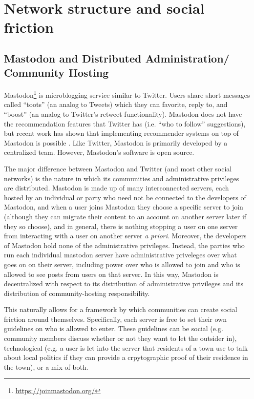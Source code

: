 \documentclass[sigconf,authordraft]{acmart}
\begin{document}
\section{Network structure and social friction}

\subsection{Mastodon and Distributed Administration/ Community Hosting}

Mastodon\footnote{\url{https://joinmastodon.org/}} is microblogging service similar to Twitter. Users share short messages called ``toots'' (an analog to Tweets) which they can favorite, reply to, and ``boost'' (an analog to Twitter's retweet functionality). Mastodon does not have the recommendation features that Twitter has (i.e. ``who to follow'' suggestions), but recent work has shown that implementing recommender systems on top of Mastodon is possible \cite{trienes2018recommending}. Like Twitter, Mastodon is primarily developed by a centralized team. However, Mastodon's software is open source.

The major difference between Mastodon and Twitter (and most other social networks) is the nature in which its communities and administrative privileges are distributed. Mastodon is made up of many interconnected servers, each hosted by an individual or party who need not be connected to the developers of Mastodon, and when a user joins Mastodon they choose a specific server to join (although they can migrate their content to an account on another server later if they so choose), and in general, there is nothing stopping a user on one server from interacting with a user on another server {\itshape a priori}. Moreover, the developers of Mastodon hold none of the administrative privileges. Instead, the parties who run each individual mastodon server have administrative priveleges over what goes on on their server, including power over who is allowed to join and who is allowed to see posts from users on that server. In this way, Mastodon is decentralized with respect to its distribution of administrative privileges and its distribution of community-hosting responsibility.

This naturally allows for a framework by which communities can create social friction around themselves. Specifically, each server is free to set their own guidelines on who is allowed to enter. These guidelines can be social (e.g. community members discuss whether or not they want to let the outsider in), technological (e.g. a user is let into the server that residents of a town use to talk about local politics if they can provide a crpytographic proof of their residence in the town), or a mix of both. 
\end{document}

